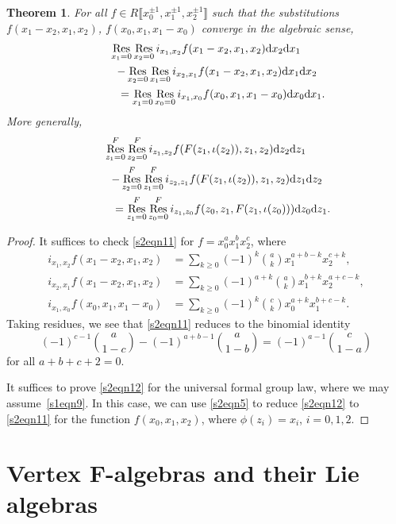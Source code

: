 \documentclass[pdftex]{sigma}
\numberwithin{equation}{section}
\newtheorem{Theorem}{Theorem}[section]
\theoremstyle{definition}
\DeclareMathOperator\Res{Res}
\def\lb{\llbracket}
\def\rb{\rrbracket}
\begin{document}
\begin{Theorem}
 For all $f\in R\big\lb x_0^{\pm1}, x_1^{\pm1}, x_2^{\pm1}\big\rb$ such that the substitutions $f(x_1-x_2,x_1,x_2)$, $f(x_0,x_1,x_1-x_0)$ converge in the algebraic sense,
 \begin{gather}
 \Res_{x_1=0}\Res_{x_2=0}i_{x_1,x_2} f(x_1-x_2,x_1,x_2) {\rm d}x_2 {\rm d}x_1\nonumber\\
\qquad -\Res_{x_2=0}\Res_{x_1=0}i_{x_2,x_1} f(x_1-x_2,x_1,x_2) {\rm d}x_1 {\rm d}x_2\nonumber\\
 \phantom{\qquad -}{}=\Res_{x_1=0}\Res_{x_0=0}i_{x_1,x_0} f(x_0,x_1,x_1-x_0) {\rm d}x_0 {\rm d}x_1. \label{s2eqn11}
 \end{gather}
 More generally,
 \begin{gather}
 \Res^F_{z_1=0}\Res^F_{z_2=0}i_{z_1,z_2} f(F(z_1,\iota(z_2)),z_1,z_2) {\rm d}z_2 {\rm d}z_1\nonumber\\
 \qquad-\Res^F_{z_2=0}\Res^F_{z_1=0}i_{z_2,z_1} f(F(z_1,\iota(z_2)),z_1,z_2) {\rm d}z_1 {\rm d}z_2\nonumber\\
 \phantom{\qquad -}{}=\Res^F_{z_1=0}\Res^F_{z_0=0}i_{z_1,z_0} f(z_0,z_1,F(z_1,\iota(z_0))) {\rm d}z_0 {\rm d}z_1. \label{s2eqn12}
 \end{gather}
\end{Theorem}
\begin{proof}
 It suffices to check \eqref{s2eqn11} for $f=x_0^a x_1^b x_2^c$, where
 \begin{align*}
 i_{x_1,x_2} f(x_1-x_2,x_1,x_2)&=\sum_{k\geqslant0}(-1)^k\binom{a}{k} x_1^{a+b-k}x_2^{c+k},\\
 i_{x_2,x_1} f(x_1-x_2,x_1,x_2)&=\sum_{k\geqslant0}(-1)^{a+k}\binom{a}{k} x_1^{b+k}x_2^{a+c-k},\\
 i_{x_1,x_0} f(x_0,x_1,x_1-x_0)&=\sum_{k\geqslant0}(-1)^k\binom{c}{k}x_0^{a+k}x_1^{b+c-k}.
 \end{align*}
 Taking residues, we see that \eqref{s2eqn11} reduces to the binomial identity
 \[
 (-1)^{c-1}\binom{a}{1-c}-(-1)^{a+b-1}\binom{a}{1-b}=(-1)^{a-1}\binom{c}{1-a}
 \]
 for all $a+b+c+2=0$.

 It suffices to prove \eqref{s2eqn12} for the universal formal group law, where we may assume~\eqref{s1eqn9}. In this case, we can use \eqref{s2eqn5} to reduce \eqref{s2eqn12} to \eqref{s2eqn11} for the function $f(x_0,x_1,x_2)$, where $\phi(z_i)=x_i$, $i=0,1,2$.
\end{proof}

\section[Vertex F-algebras and their Lie algebras]{Vertex $\boldsymbol{F}$-algebras and their Lie algebras}
\label{s4}
\end{document}
